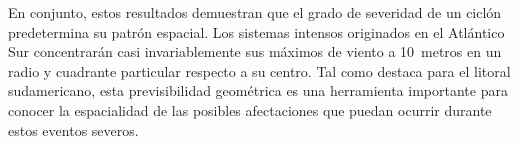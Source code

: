 En conjunto, estos resultados demuestran que el grado de severidad de un ciclón predetermina su patrón espacial. Los sistemas intensos originados en el Atlántico Sur concentrarán casi invariablemente sus máximos de viento a 10~metros en un radio y cuadrante particular respecto a su centro. Tal como destaca \citet{dalanhese2023new} para el litoral sudamericano, esta previsibilidad geométrica es una herramienta importante para conocer la espacialidad de las posibles afectaciones que puedan ocurrir durante estos eventos severos.




